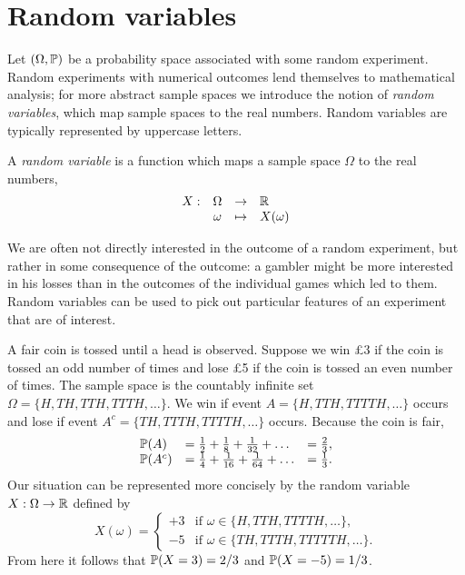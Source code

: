 
\section{Random variables}\label{sec:rvs}

Let $(\Omega,\mathbb{P})$ be a probability space associated with some random experiment. Random experiments with numerical outcomes lend themselves to mathematical analysis; for more abstract sample spaces we introduce the notion of \emph{random variables}, which map sample spaces to the real numbers. Random variables are typically represented by uppercase letters.

\begin{definition}
A \emph{random variable} is a function which maps a sample space $\Omega$ to the real numbers,
\[
\begin{array}{rccl}
	X:	& \Omega	& \to		& \mathbb{R} \\
		& \omega	& \mapsto	& X(\omega)
\end{array}
\]
\end{definition}

We are often not directly interested in the outcome of a random experiment, but rather in some consequence of the outcome: a gambler might be more interested in his losses than in the outcomes of the individual games which led to them. Random variables can be used to pick out particular features of an experiment that are of interest.


\begin{example}
A fair coin is tossed until a head is observed. Suppose we win \pounds 3 if the coin is tossed an odd number of times and lose \pounds 5 if the coin is tossed an even number of times. The sample space is the countably infinite set $\Omega=\{H,TH,TTH,TTTH,\ldots\}$. We win if event $A=\{H,TTH, TTTTH,\ldots\}$ occurs and lose if event $A^c=\{TH, TTTH, TTTTH,\ldots\}$ occurs. Because the coin is fair,
\[\begin{array}{lll}
\mathbb{P}(A) 	& = \frac{1}{2} + \frac{1}{8} + \frac{1}{32} + \ldots	& = \frac{2}{3}, \\ 
\mathbb{P}(A^c) 	& = \frac{1}{4} + \frac{1}{16} + \frac{1}{64} + \ldots 	& =  \frac{1}{3}.
\end{array}\]
Our situation can be represented more concisely by the random variable $X:\Omega\to\mathbb{R}$ defined by
\[
X(\omega) =
  \begin{cases}
   +3 & \text{if } \omega\in \{H, TTH, TTTTH, \ldots\}, \\
   -5 & \text{if } \omega\in \{TH, TTTH, TTTTTH, \ldots\}.
  \end{cases}
\]
From here it follows that $\mathbb{P}(X=3)=2/3$ and $\mathbb{P}(X=-5)=1/3$.
\end{example}

